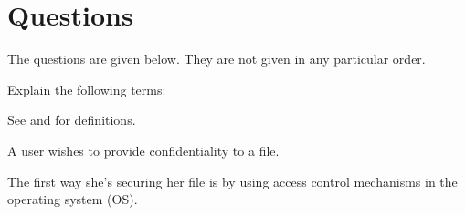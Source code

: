 \documentclass[svv,addpoints]{miunexam}
\begin{document}
\clearpage
\section*{Questions}
The questions are given below.
They are not given in any particular order.

\begin{questions}

  \question\label{q:terminology}
  Explain the following terms:
  \begin{solution}
    See \cite{Gollmann2011cs} and \cite{Anderson2008sea} for definitions.
  \end{solution}


  \question\label{q:non-repudiation}
  A user wishes to provide confidentiality to a file.
  \begin{solution}
    The first way she's securing her file is by using access control mechanisms 
    in the operating system (OS).


\end{solution}
\end{questions}
\end{document}
